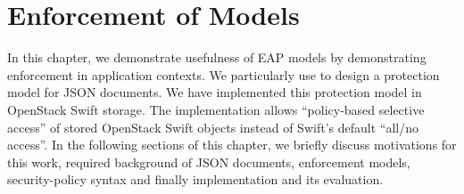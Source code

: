 \chapter{Enforcement of \eapABAC{} Models}
\label{sec:enforcements}
In this chapter, we demonstrate usefulness of EAP models by demonstrating enforcement in application contexts. We particularly use \eapABAC{} to design a protection model for JSON documents. We have implemented this protection model in OpenStack Swift storage.  The implementation allows ``policy-based selective access'' of stored OpenStack Swift objects instead of Swift's default ``all/no access''. In the following sections of this chapter, we briefly discuss motivations for this work, required background of JSON documents, enforcement models, security-policy syntax and finally implementation and its evaluation. 

	
	
	



	
%	